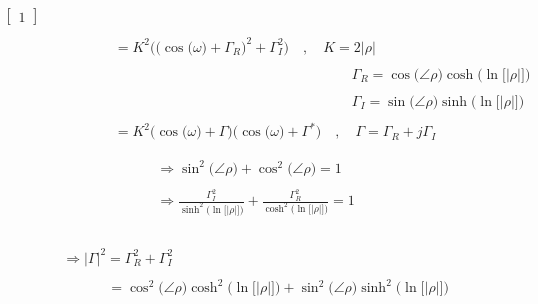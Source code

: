 \documentclass{article}
\begin{document}
\begin{align*}
\begin{bmatrix}
                                                                                                                    1 
                                                                                                                  \end{bmatrix} \\ \\
    & \quad \quad \quad \quad \ \ = K^{2}\Bigg(\bigg(\cos\big(\omega\big) + \Gamma_{R}\bigg)^{2} + \Gamma_{I}^{2}\Bigg) \quad, \quad K = 2\big|\rho\big| \\ \\
    & \quad \quad \quad \quad \quad \quad \quad \quad \quad \quad \quad \quad \quad \quad \quad \quad \quad \quad \quad \quad \quad \ \ \Gamma_{R} = \cos\big(\angle{\rho}\big)\cosh\Big(\ln\Big[\big|\rho\big|\Big]\Big) \\ \\
    & \quad \quad \quad \quad \quad \quad \quad \quad \quad \quad \quad \quad \quad \quad \quad \quad \quad \quad \quad \quad \quad \ \ \Gamma_{I} = \sin\big(\angle{\rho}\big)\sinh\Big(\ln\Big[\big|\rho\big|\Big]\Big) \\ \\
    & \quad \quad \quad \quad \ \ = K^{2}\Big(\cos\big(\omega\big) + \Gamma\Big)\Big(\cos\big(\omega\big) + \Gamma^{*}\Big) \quad , \quad \Gamma = \Gamma_{R} + j\Gamma_{I}
\end{align*}

\begin{align*}
    &\Rightarrow \sin^{2}\big(\angle{\rho}\big) + \cos^{2}\big(\angle{\rho}\big) = 1 \\ \\
    &\Rightarrow \frac{\Gamma_{I}^{2}}{\sinh^{2}\Big(\ln\Big[\big|\rho\big|\Big]\Big)} + \frac{\Gamma_{R}^{2}}{\cosh^{2}\Big(\ln\Big[\big|\rho\big|\Big]\Big)} = 1 \\ \\
\end{align*}

\begin{align*}
    &\Rightarrow \big|\Gamma\big|^{2} = \Gamma_{R}^{2} + \Gamma_{I}^{2} \\ \\
    & \quad \quad \quad \ = \cos^{2}\big(\angle{\rho}\big)\cosh^{2}\Big(\ln\Big[\big|\rho\big|\Big]\Big) + \sin^{2}\big(\angle{\rho}\big)\sinh^{2}\Big(\ln\Big[\big|\rho\big|\Big]\Big)
\end{align*}
\end{document}
